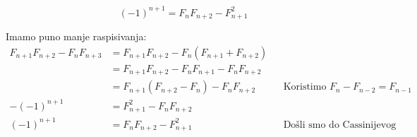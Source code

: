 \documentclass[exam.tex]{subfiles}
\begin{document}
	\[ (-1)^{n + 1} = F_n F_{n + 2} - F^2_{n + 1} \]
	
	Imamo puno manje raspisivanja:
	\begin{align*}
	F_{n + 1} F_{n + 2} - F_n F_{n + 3} &= F_{n + 1} F_{n + 2} - F_n (F_{n + 1} + F_{n + 2}) \\
	&= F_{n + 1} F_{n + 2} - F_n F_{n + 1} - F_n F_{n + 2} \\
	&= F_{n + 1} (F_{n + 2} - F_n) - F_n F_{n + 2} && \text{Koristimo } F_n - F_{n - 2} = F_{n - 1}\\
	- (-1)^{n + 1} &= F^2_{n + 1} - F_n F_{n + 2} \\
	(-1)^{n + 1} &= F_n F_{n + 2} - F^2_{n + 1} && \text{Došli smo do Cassinijevog identiteta}
	\end{align*}
\end{document}
